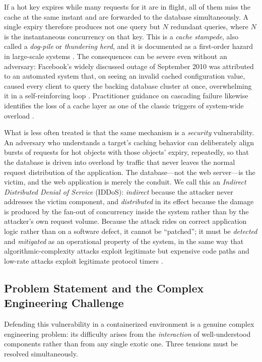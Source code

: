 If a hot key expires while many requests for it are in flight, all of them miss the
cache at the same instant and are forwarded to the database simultaneously. A single
expiry therefore produces not one query but $N$ redundant queries, where $N$ is the
instantaneous concurrency on that key. This is a \emph{cache stampede}, also called a
\emph{dog-pile} or \emph{thundering herd}, and it is documented as a first-order hazard
in large-scale systems \cite{vattani2015,nishtala2013}. The consequences can be
severe even without an adversary: Facebook's widely discussed outage of September 2010
was attributed to an automated system that, on seeing an invalid cached configuration
value, caused every client to query the backing database cluster at once, overwhelming
it in a self-reinforcing loop \cite{johnson2010}. Practitioner guidance on cascading
failure likewise identifies the loss of a cache layer as one of the classic triggers of
system-wide overload \cite{beyer2016}.

What is less often treated is that the same mechanism is a \emph{security}
vulnerability. An adversary who understands a target's caching behavior can
deliberately align bursts of requests for hot objects with those objects' expiry,
repeatedly, so that the database is driven into overload by traffic that never leaves
the normal request distribution of the application. The database---not the web
server---is the victim, and the web application is merely the conduit. We call this
an \emph{Indirect Distributed Denial of Service} (IDDoS): \emph{indirect} because the
attacker never addresses the victim component, and \emph{distributed} in its effect
because the damage is produced by the fan-out of concurrency inside the system rather
than by the attacker's own request volume. Because the attack rides on correct
application logic rather than on a software defect, it cannot be ``patched''; it must
be \emph{detected} and \emph{mitigated} as an operational property of the system, in
the same way that algorithmic-complexity attacks exploit legitimate but expensive code
paths \cite{crosby2003} and low-rate attacks exploit legitimate protocol timers
\cite{kuzmanovic2003}.

\subsection{Problem Statement and the Complex Engineering Challenge}
Defending this vulnerability in a containerized environment is a genuine complex
engineering problem: its difficulty arises from the \emph{interaction} of
well-understood components rather than from any single exotic one. Three tensions
must be resolved simultaneously.

